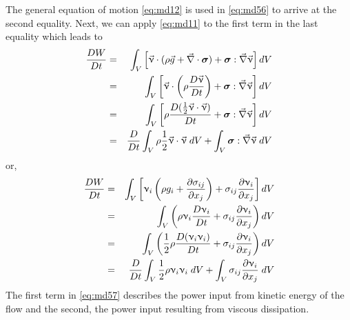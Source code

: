 The general equation of motion \eqref{eq:md12} is used in \eqref{eq:md56} 
to arrive at the second equality.
Next, we can apply \eqref{eq:md11} to the first term in the last equality which leads to
\begin{eqnarray}
\frac{DW}{Dt} 
&=& \int_V \left[ \vec\upnu\cdot ( \rho \vec{g} + \vec\nabla\cdot {\bm \sigma})
+{\bm \sigma} : \vec\nabla\vec\upnu \right] dV \nonumber\\
&=&\int_V \left[ \vec\upnu\cdot \left( \rho \frac{D \vec{\upnu}}{Dt} \right)
+{\bm \sigma} : \vec\nabla\vec\upnu \right] dV \nonumber\\
&=& \int_V \left[ \rho \frac{D (\frac12 \vec\upnu\cdot\vec{\upnu} )}{Dt} 
+{\bm \sigma} : \vec\nabla\vec\upnu \right] dV \nonumber\\
&=&\frac{D}{Dt} \int_V  \rho \frac12 \vec\upnu\cdot\vec{\upnu}\;  dV
+\int_V {\bm \sigma} : \vec\nabla\vec\upnu \; dV 
\end{eqnarray}
or,
\begin{eqnarray}
\frac{DW}{Dt} &=& 
\int_V \left[ \upnu_i \left( \rho g_i +  \frac{\partial\sigma_{ij}}{\partial x_j}  \right) 
+ \sigma_{ij} \frac{\partial \upnu_i }{\partial x_j}  \right] dV \nonumber\\
&=& \int_V \left(\rho \upnu_i \frac{D\upnu_i}{Dt} 
+ \sigma_{ij}  \frac{\partial \upnu_i }{\partial x_j} \right) dV \nonumber\\
&=& \int_V \left(\frac12 \rho \frac{D (\upnu_i\upnu_i)}{Dt} 
+ \sigma_{ij}  \frac{\partial \upnu_i }{\partial x_j} \right) dV \nonumber\\
&=& \frac{D}{Dt} \int_V \frac12 \rho \upnu_i\upnu_i \; dV + 
\int_V   \sigma_{ij}  \frac{\partial \upnu_i }{\partial x_j} \; dV 
\label{eq:md57}
\end{eqnarray}
The first term in \eqref{eq:md57} 
describes the power input from kinetic energy of the flow and the
second, the power input resulting from viscous dissipation.

